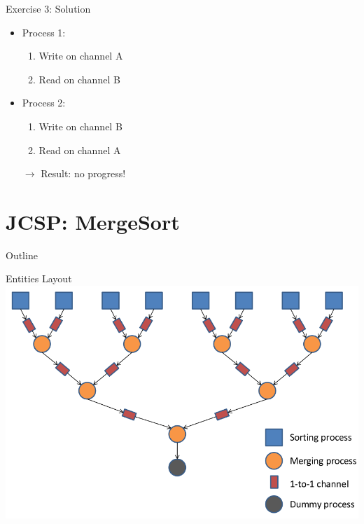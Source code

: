 \begin{frame}{Exercise 3: Solution}
  \begin{itemize}
  \item Process 1:
    \begin{enumerate}
    \item Write on channel A
    \item Read on channel B
    \end{enumerate}
  \item Process 2:
    \begin{enumerate}
    \item Write on channel B
    \item Read on channel A
    \end{enumerate}
  \item[$\rightarrow$] Result: no progress!
  \end{itemize}
\end{frame}


\section{JCSP: MergeSort}

\begin{frame}{Outline}
  \tableofcontents[current]
\end{frame}

\begin{frame}{Entities Layout}
  \includegraphics[width=\textwidth]{figures/mergesort}
\end{frame}

